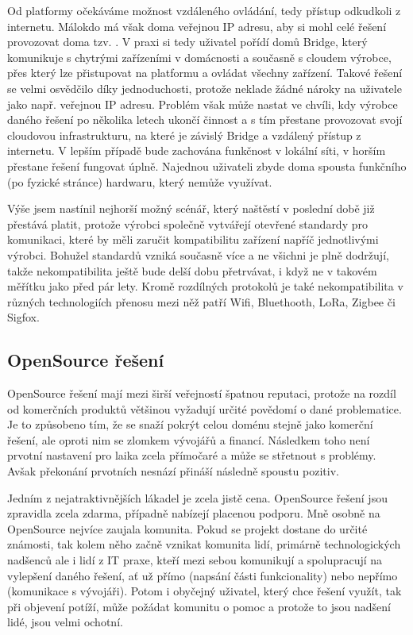 Od platformy očekáváme možnost vzdáleného ovládání, tedy přístup odkudkoli z internetu. Málokdo má však doma veřejnou IP adresu, aby si mohl celé řešení provozovat doma tzv. . V praxi si tedy uživatel pořídí domů Bridge, který komunikuje s chytrými zařízeními v domácnosti a současně s cloudem výrobce, přes který lze přistupovat na platformu a ovládat všechny zařízení. Takové řešení se velmi osvědčilo díky jednoduchosti, protože neklade žádné nároky na uživatele jako např. veřejnou IP adresu. Problém však může nastat ve chvíli, kdy výrobce daného řešení po několika letech ukončí činnost a s tím přestane provozovat svojí cloudovou infrastrukturu, na které je závislý Bridge a vzdálený přístup z internetu. V lepším případě bude zachována funkčnost v lokální síti, v horším přestane řešení fungovat úplně. Najednou uživateli zbyde doma spousta funkčního (po fyzické stránce) hardwaru, který nemůže využívat.

Výše jsem nastínil nejhorší možný scénář, který naštěstí v poslední době již přestává platit, protože výrobci společně vytvářejí otevřené standardy pro komunikaci, které by měli zaručit kompatibilitu zařízení napříč jednotlivými výrobci. Bohužel standardů vzniká současně více a ne všichni je plně dodržují, takže nekompatibilita ještě bude delší dobu přetrvávat, i když ne v takovém měřítku jako před pár lety. Kromě rozdílných protokolů je také nekompatibilita v různých technologiích přenosu mezi něž patří Wifi, Bluethooth, LoRa, Zigbee či Sigfox.

\subsection{OpenSource řešení}
OpenSource řešení mají mezi širší veřejností špatnou reputaci, protože na rozdíl od komerčních  produktů většinou vyžadují určité povědomí o dané problematice. Je to způsobeno tím, že se snaží pokrýt celou doménu stejně jako komerční řešení, ale oproti nim se zlomkem vývojářů a financí. Následkem toho není prvotní nastavení pro laika zcela přímočaré a může se střetnout s problémy. Avšak překonání prvotních nesnází přináší následně spoustu pozitiv.

Jedním z nejatraktivnějších lákadel je zcela jistě cena. OpenSource řešení jsou zpravidla zcela zdarma, případně nabízejí placenou podporu. Mně osobně na OpenSource nejvíce zaujala komunita. Pokud se projekt dostane do určité známosti, tak kolem něho začně vznikat komunita lidí, primárně technologických nadšenců ale i lidí z IT praxe, kteří mezi sebou komunikují a spolupracují na vylepšení daného řešení, ať už přímo (napsání části funkcionality) nebo nepřímo (komunikace s vývojáři). Potom i obyčejný uživatel, který chce řešení využít, tak při objevení potíží, může požádat komunitu o pomoc a protože to jsou nadšení lidé, jsou velmi ochotní.

